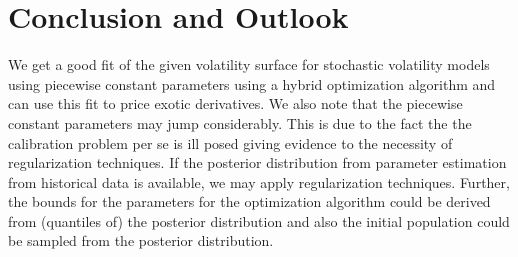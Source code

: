 \documentclass[10pt,a4paper]{article}
\numberwithin{equation}{section} %
\theoremstyle{plain}
\theoremstyle{definition}
\theoremstyle{remark}
\begin{document}
\begin{figure}
\end{figure}

\section{Conclusion and Outlook}
\label{sec:Conclusion}

We get a good fit of the given volatility surface for stochastic volatility models using piecewise constant parameters using a hybrid optimization algorithm and can use this fit to price exotic derivatives. We also note that the piecewise constant parameters may jump considerably. This is due to the fact the the calibration problem per se is ill posed giving evidence to the necessity of regularization techniques.
If the posterior distribution from parameter estimation from historical data is available, we may apply regularization techniques. Further, the bounds for the parameters for the optimization algorithm could be derived from (quantiles of) the posterior distribution and also the initial population could be sampled from the posterior distribution. 



\begin{small}      

\end{small}

\typeout{#####################################}
\end{document}
